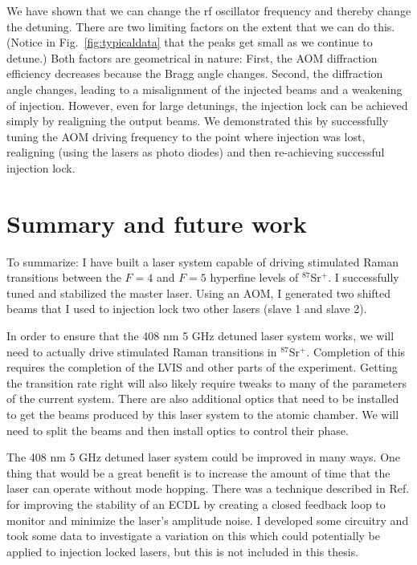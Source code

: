 

We have shown that we can change the rf oscillator frequency and thereby change the detuning. There are two limiting factors on the extent that we can do this. (Notice in Fig.\ \ref{fig:typicaldata} that the peaks get small as we continue to detune.) Both factors are geometrical in nature: First, the AOM diffraction efficiency decreases because the Bragg angle changes. Second, the diffraction angle changes, leading to a misalignment of the injected beams and a weakening of injection. However, even for large detunings, the injection lock can be achieved simply by realigning the output beams. We demonstrated this by successfully tuning the AOM driving frequency to the point where injection was lost, realigning (using the lasers as photo diodes) and then re-achieving successful injection lock.

\section{Summary and future work}
To summarize: I have built a laser system capable of driving stimulated Raman transitions between the $F=4$ and $F=5$ hyperfine levels of $^{87}$Sr$^+$. I successfully tuned and stabilized the master laser. Using an AOM, I generated two shifted beams that I used to injection lock two other lasers (slave 1 and slave 2).

In order to ensure that the 408 nm 5 GHz detuned laser system works, we will need to actually drive stimulated Raman transitions in $^{87}$Sr$^+$. Completion of this requires the completion of the LVIS and other parts of the experiment. Getting the transition rate right will also likely require tweaks to many of the parameters of the current system. There are also additional optics that need to be installed to get the beams produced by this laser system to the atomic chamber. We will need to split the beams and then install optics to control their phase. 

The 408 nm 5 GHz detuned laser system could be improved in many ways. One thing that would be a great benefit is to increase the amount of time that the laser can operate without mode hopping. There was a technique described in Ref.\,\cite{chiowChuLock} for improving the stability of an ECDL by creating a closed feedback loop to monitor and minimize the laser's amplitude noise. I developed some circuitry and took some data to investigate a variation on this which could potentially be applied to injection locked lasers, but this is not included in this thesis. 


